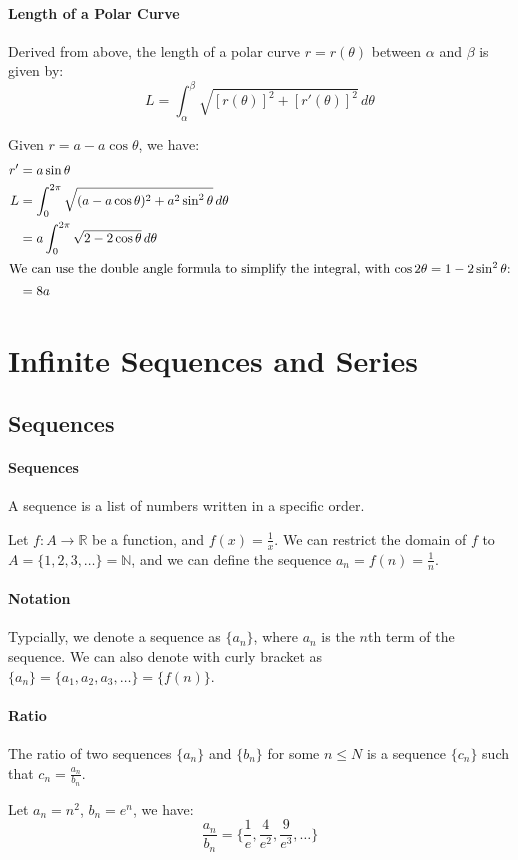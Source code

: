 \documentclass[11pt]{report}
\begin{document}
\paragraph{Length of a Polar Curve} Derived from above, the length of a polar curve $r = r(\theta)$ between $\alpha$ and $\beta$ is given by:
\begin{equation}
    L = \int_{\alpha}^{\beta} \sqrt{[r(\theta)]^2 + [r'(\theta)]^2} \, d\theta
\end{equation}
\begin{example}
    Given $r = a - a\cos \theta$, we have:
    \begin{align*}
        r' &= a\sin \theta \\
        L &= \int_0^{2\pi} \sqrt{(a - a\cos \theta)^2 + a^2\sin^2 \theta} \, d\theta \\
        &= a\int_0^{2\pi} \sqrt{2 - 2\cos \theta} \, d\theta \\
        \intertext{We can use the double angle formula to simplify the integral, with $\cos 2\theta = 1 - 2\sin^2 \theta$:}
        &= 8a
    \end{align*}
\end{example}
\section{Infinite Sequences and Series}
\subsection{Sequences}
\paragraph{Sequences} A sequence is a list of numbers written in a specific order.
\begin{example}
    Let $f: A \to \mathbb{R}$ be a function, and $f(x) = \frac{1}{x}$. We can restrict the domain of $f$ to $A = \{1, 2, 3, \ldots\} = \mathbb{N}$, and we can define the sequence $a_n = f(n) = \frac{1}{n}$.
\end{example}
\paragraph{Notation} Typcially, we denote a sequence as $\{a_n\}$, where $a_n$ is the $n$th term of the sequence. We can also denote with curly bracket as $\{a_n\} = \{a_1, a_2, a_3, \ldots\} = \{f(n)\}$.
\paragraph{Ratio} The ratio of two sequences $\{a_n\}$ and $\{b_n\}$ for some $n \le N$ is a sequence $\{c_n\}$ such that $c_n = \frac{a_n}{b_n}$.
\begin{example}
    Let $a_n = n^2$, $b_n = e^n$, we have:
    $$\frac{a_n}{b_n} = \{\frac{1}{e}, \frac{4}{e^2}, \frac{9}{e^3}, \ldots\}$$
\end{example}
\end{document}
